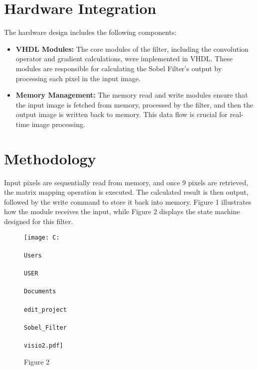 \documentclass[DIV=calc, paper=a4, fontsize=11pt, twocolumn]{scrartcl}	 %
\begin{document}

\section*{\small{Hardware Integration}}


\small{The hardware design includes the following components:}
\begin{itemize}
  \item \textbf{VHDL Modules:} The core modules of the filter, including the convolution operator and gradient calculations, 
                               were implemented in VHDL. These modules are responsible for calculating the Sobel Filter's output 
                               by processing each pixel in the input image.
  
  \item \textbf{Memory Management:} The memory read and write modules ensure that the input image is fetched from memory, processed 
                                    by the filter, and then the output image is written back to memory. This data flow is crucial for 
                                    real-time image processing.
\end{itemize}



\section*{\small{Methodology}}


Input pixels are sequentially read from memory, and once 9 pixels are retrieved, the matrix mapping operation is executed. 
The calculated result is then output, followed by the write command to store it back into memory. Figure 1 illustrates how 
the module receives the input, while Figure 2 displays the state machine designed for this filter.

\begin{figure}[htbp]
  \centering
  \texttt{[image: C:\\\\Users\\\\USER\\\\Documents\\\\edit\_project\\\\Sobel\_Filter\\\\visio2.pdf]}
  \caption{Figure 2}
  \label{fig:visio-diagram}
\end{figure}
\end{document}
